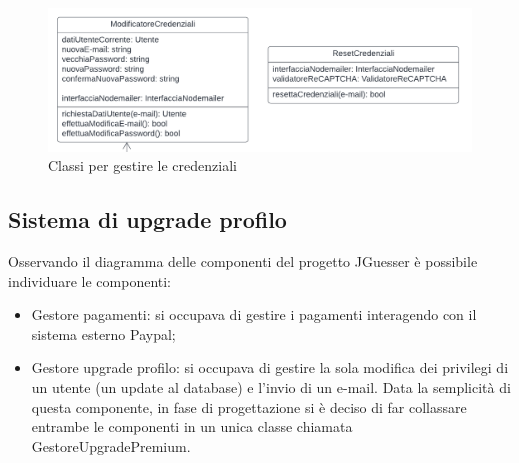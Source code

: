 \begin{figure}[!h]
\centering
\includegraphics[scale=0.35]{images/classe_modifica_reset_credenziali.png}
\caption{Classi per gestire le credenziali}
\label{fig:classi_gestione_credenziali}
\end{figure}
\noindent

\subsection{Sistema di upgrade profilo}
Osservando il diagramma delle componenti del progetto JGuesser è possibile individuare le componenti:
\begin{itemize}
    \item Gestore pagamenti: si occupava di gestire i pagamenti interagendo con il sistema esterno Paypal; 
    \item Gestore upgrade profilo: si occupava di gestire la sola modifica dei privilegi di un utente (un update al database) e l'invio di un e-mail. Data la semplicità di questa componente, in fase di progettazione si è deciso di far collassare entrambe le componenti in un unica classe chiamata GestoreUpgradePremium.
\end{itemize}

